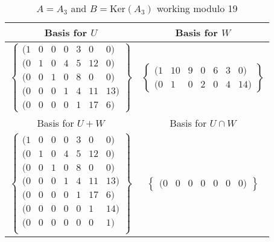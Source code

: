 \documentclass[10pt,a4paper,notitlepage]{article}
\newcommand{\Ker}{\text{Ker}}
\begin{document}
\begin{table}[H]
\centering
\begin{tabular}{|c|c|}
\hline
Basis for $U$ & Basis for $W$ \\
\hline
$\left\lbrace\begin{array}{ccccccc}
(1 & 0 & 0 & 0 & 3 & 0 & 0)\\
(0 & 1 & 0 & 4 & 5 & 12 & 0)\\
(0 & 0 & 1 & 0 & 8 & 0 & 0)\\
(0 & 0 & 0 & 1 & 4 & 11 & 13)\\
(0 & 0 & 0 & 0 & 1 & 17 & 6)
\end{array}
\right\rbrace$ & $\left\lbrace\begin{array}{ccccccc}
(1	& 10	& 9	& 0	& 6	& 3	& 0)\\
(0	& 1	& 0	& 2	& 0	& 4	& 14)
\end{array}
\right\rbrace$ \\
\hline Basis for $U+W$ & Basis for $U\cap W$\\
\hline $\left\lbrace\begin{array}{ccccccc}
(1	& 0	& 0	& 0	& 3	& 0	& 0)\\
(0	& 1	& 0	& 4	& 5	& 12	& 0)\\
(0	& 0	& 1	& 0	& 8	& 0	& 0)\\
(0	& 0	& 0	& 1	& 4	& 11	& 13)\\
(0	& 0	& 0	& 0	& 1	& 17	& 6)\\
(0	& 0	& 0	& 0	& 0	& 1	& 14)\\
(0	& 0	& 0	& 0	& 0	& 0	& 1)\\
\end{array}
\right\rbrace$ & $\left\lbrace\begin{array}{ccccccc}
(0 & 0 & 0 & 0 & 0 & 0 & 0)
\end{array}
\right\rbrace$ \\
\hline
\end{tabular}
\caption{$A=A_{3}$ and $B=\Ker(A_{3})$ working modulo 19}
\end{table}
\end{document}
